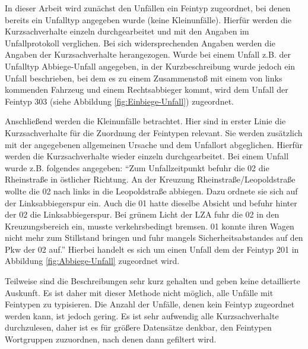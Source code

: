 In dieser Arbeit wird zunächst den Unfällen ein Feintyp zugeordnet, bei denen bereits ein Unfalltyp angegeben wurde (keine Kleinunfälle). Hierfür werden die Kurzsachverhalte einzeln durchgearbeitet und mit den Angaben im Unfallprotokoll verglichen. Bei sich widersprechenden Angaben werden die Angaben der Kurzsachverhalte herangezogen. Wurde bei einem Unfall z.B. der Unfalltyp Abbiege-Unfall angegeben, in der Kurzbeschreibung wurde jedoch ein Unfall beschrieben, bei dem es zu einem Zusammenstoß mit einem von links kommenden Fahrzeug und einem Rechtsabbieger kommt, wird dem Unfall der Feintyp 303 (siehe Abbildung \ref{fig:Einbiege-Unfall}) zugeordnet.

Anschließend werden die Kleinunfälle betrachtet. Hier sind in erster Linie die Kurzsachverhalte für die Zuordnung der Feintypen relevant. Sie werden zusätzlich mit der angegebenen allgemeinen Ursache und dem Unfallort abgeglichen. Hierfür werden die Kurzsachverhalte wieder einzeln durchgearbeitet. Bei einem Unfall wurde z.B. folgendes angegeben: \enquote{Zum Unfallzeitpunkt befuhr die 02 die Rheinstraße in östlicher Richtung. An der Kreuzung Rheinstraße/Leopoldstraße wollte die 02 nach links in die Leopoldstraße abbiegen. Dazu ordnete sie sich auf der Linksabbiegerspur ein. Auch die 01 hatte dieselbe Absicht und befuhr hinter der 02 die Linksabbiegerspur. Bei grünem Licht der LZA fuhr die 02 in den Kreuzungsbereich ein, musste verkehrsbedingt bremsen. 01 konnte ihren Wagen nicht mehr zum Stillstand bringen und fuhr mangels Sicherheitsabstandes auf den Pkw der 02 auf.} Hierbei handelt es sich um einen Unfall dem der Feintyp 201 in Abbildung \ref{fig:Abbiege-Unfall} zugeordnet wird.

Teilweise sind die Beschreibungen sehr kurz gehalten und geben keine detaillierte Auskunft. Es ist daher mit dieser Methode nicht möglich, alle Unfälle mit Feintypen zu typisieren. Die Anzahl der Unfälle, denen kein Feintyp zugeordnet werden kann, ist jedoch gering. Es ist sehr aufwendig alle Kurzsachverhalte durchzulesen, daher ist es für größere Datensätze denkbar, den Feintypen Wortgruppen zuzuordnen, nach denen dann gefiltert wird. %

